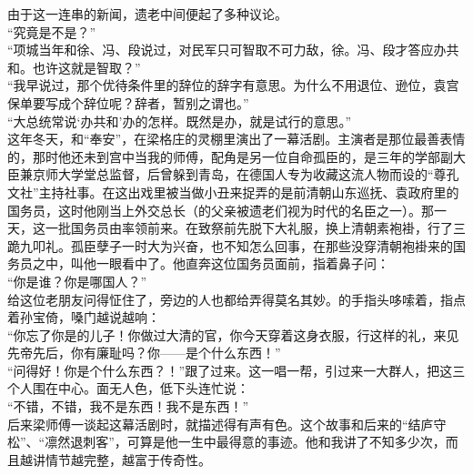 由于这一连串的新闻，遗老中间便起了多种议论。\\

“究竟是不是？”\\

“项城当年和徐、冯、段说过，对民军只可智取不可力敌，徐。冯、段才答应办共和。也许这就是智取？”\\

“我早说过，那个优待条件里的辞位的辞字有意思。为什么不用退位、逊位，袁宫保单要写成个辞位呢？辞者，暂别之谓也。”\\

“大总统常说‘办共和’办的怎样。既然是办，就是试行的意思。”\\

这年冬天，和“奉安”，在梁格庄的灵棚里演出了一幕活剧。主演者是那位最善表情的，那时他还未到宫中当我的师傅，配角是另一位自命孤臣的，是三年的学部副大臣兼京师大学堂总监督，后曾躲到青岛，在德国人专为收藏这流人物而设的“尊孔文社”主持社事。在这出戏里被当做小丑来捉弄的是前清朝山东巡抚、袁政府里的国务员，这时他刚当上外交总长（的父亲被遗老们视为时代的名臣之一）。那一天，这一批国务员由率领前来。在致祭前先脱下大礼服，换上清朝素袍褂，行了三跪九叩礼。孤臣孽子一时大为兴奋，也不知怎么回事，在那些没穿清朝袍褂来的国务员之中，叫他一眼看中了。他直奔这位国务员面前，指着鼻子问：\\

“你是谁？你是哪国人？”\\

给这位老朋友问得怔住了，旁边的人也都给弄得莫名其妙。的手指头哆嗦着，指点着孙宝倚，嗓门越说越响：\\

“你忘了你是的儿子！你做过大清的官，你今天穿着这身衣服，行这样的礼，来见先帝先后，你有廉耻吗？你——是个什么东西！”\\

“问得好！你是个什么东西？！”跟了过来。这一唱一帮，引过来一大群人，把这三个人围在中心。面无人色，低下头连忙说：\\

“不错，不错，我不是东西！我不是东西！”\\

后来梁师傅一谈起这幕活剧时，就描述得有声有色。这个故事和后来的“结庐守松”、“凛然退刺客”，可算是他一生中最得意的事迹。他和我讲了不知多少次，而且越讲情节越完整，越富于传奇性。\\

